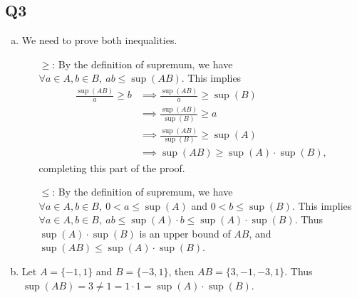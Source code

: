 \documentclass[12pt,lettersize]{article}
\theoremstyle{remark}
\begin{document}
\subsection*{Q3}
\begin{enumerate}[(a)]
	\item We need to prove both inequalities.
	\begin{itemize}
		\item[$\geq$:] By the definition of supremum, we have $\forall a\in A, b\in B,\ ab\leq\sup(AB)$. This implies
		\begin{align*}
			\frac{\sup(AB)}{a}\geq b &\implies \frac{\sup(AB)}{a}\geq\sup(B)\\
									 &\implies \frac{\sup(AB)}{\sup(B)}\geq a\\
									 &\implies \frac{\sup(AB)}{\sup(B)}\geq \sup(A)\\
									 &\implies \sup(AB)\geq \sup(A)\cdot\sup(B),
		\end{align*}
		completing this part of the proof.
		\item[$\leq$:] By the definition of supremum, we have $\forall a\in A, b\in B,\ 0<a\leq\sup(A)$ and $0<b\leq\sup (B)$. This implies $\forall a\in A, b\in B,\ ab\leq\sup (A)\cdot b\leq \sup (A)\cdot\sup (B)$. Thus $\sup (A)\cdot\sup (B)$ is an upper bound of $AB$, and $\sup(AB)\leq\sup (A)\cdot\sup (B)$.
	\end{itemize}
	\item Let $A=\{-1,1\}$ and $B=\{-3,1\}$, then $AB=\{3,-1,-3,1\}$. Thus $\sup(AB)=3\neq1=1\cdot1=\sup(A)\cdot\sup(B)$.
\end{enumerate}

\newpage
\end{document}
